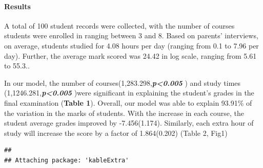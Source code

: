 \documentclass[
]{article}
\newenvironment{Shaded}{\begin{snugshade}}{\end{snugshade}}
\newcommand{\AttributeTok}[1]{\textcolor[rgb]{0.13,0.29,0.53}{#1}}
\newcommand{\DecValTok}[1]{\textcolor[rgb]{0.00,0.00,0.81}{#1}}
\newcommand{\FunctionTok}[1]{\textcolor[rgb]{0.13,0.29,0.53}{\textbf{#1}}}
\newcommand{\NormalTok}[1]{#1}
\newcommand{\OtherTok}[1]{\textcolor[rgb]{0.56,0.35,0.01}{#1}}
\newcommand{\SpecialCharTok}[1]{\textcolor[rgb]{0.81,0.36,0.00}{\textbf{#1}}}
\newcommand{\StringTok}[1]{\textcolor[rgb]{0.31,0.60,0.02}{#1}}
\begin{document}
\hypertarget{results}{%
\paragraph{Results}\label{results}}

A total of 100 student records were collected, with the number of
courses students were enrolled in ranging between 3 and 8. Based on
parents' interviews, on average, students studied for 4.08 hours per day
(ranging from 0.1 to 7.96 per day). Further, the average mark scored was
24.42 in log scale, ranging from 5.61 to 55.3..

\begin{Shaded}
\end{Shaded}

In our model, the number of
courses(1,283.298,\textbf{\emph{p\textless0.005}} ) and study times
(1,1246.281,\textbf{\emph{p\textless0.005}} )were significant in
explaining the student's grades in the final examination (\textbf{Table
1}). Overall, our model was able to explain 93.91\% of the variation in
the marks of students. With the increase in each course, the student
average grades improved by -7.456(1.174). Similarly, each extra hour of
study will increase the score by a factor of 1.864(0.202) (Table 2,
Fig1)

\begin{verbatim}
## 
## Attaching package: 'kableExtra'
\end{verbatim}
\end{document}

